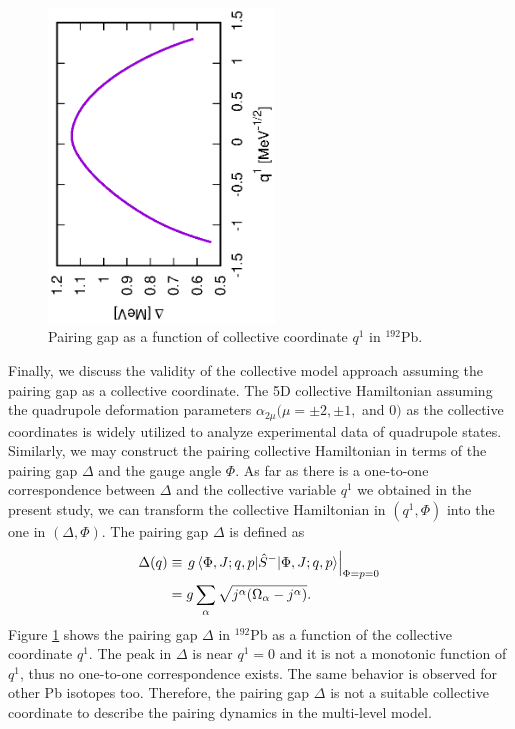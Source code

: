 \documentclass[%
superscriptaddress,
showpacs,
nofootinbib,
amsmath,amssymb,
aps,
prc,
twocolumn,
floatfix ]%
{revtex4-1}
\begin{document}
\begin{figure}[htbp]
 \begin{center}
  \includegraphics[width=60mm,angle=-90]{192Pbgap.eps}
 \end{center}
	\caption{Pairing gap as a function of collective coordinate $q^1$
	in ${}^{192}$Pb. 
}
 \label{192Pb_gap}
\end{figure}
Finally, we discuss the validity of the collective model approach
assuming the pairing gap as a collective coordinate.
The 5D collective Hamiltonian assuming the quadrupole deformation
parameters $\alpha_{2\mu} (\mu=\pm2,\pm1,$ and $0)$ as the collective coordinates
is widely utilized to analyze experimental data of quadrupole states.
Similarly, we may construct the pairing collective Hamiltonian
in terms of the pairing gap $\Delta$ and the gauge angle $\Phi$. 
As far as there is a one-to-one correspondence between $\Delta$ 
and the collective variable $q^1$ we obtained in the present study,
we can transform the collective Hamiltonian in $(q^1,\Phi)$
into the one in $(\Delta,\Phi)$.
The pairing gap $\Delta$ is defined as
\begin{align}
  \Delta (q) &\equiv \left. g\braket{\Phi,J;q,p|\hat{S}^-|\Phi,J;q,p} \right|_{\Phi=p=0} \nonumber \\
  &= g\sum_\alpha \sqrt{j^\alpha(\Omega_\alpha-j^\alpha)} .
\end{align}
Figure \ref{192Pb_gap} shows the pairing gap $\Delta$ in ${}^{192}$Pb
as a function of the collective coordinate $q^1$.
The peak in $\Delta$ is near $q^1=0$ and it is not a monotonic
function of $q^1$, thus no one-to-one correspondence exists.
The same behavior is observed for other Pb isotopes too.
Therefore, the pairing gap $\Delta$ is not a suitable collective coordinate
to describe the pairing dynamics in the multi-level model.
\end{document}
